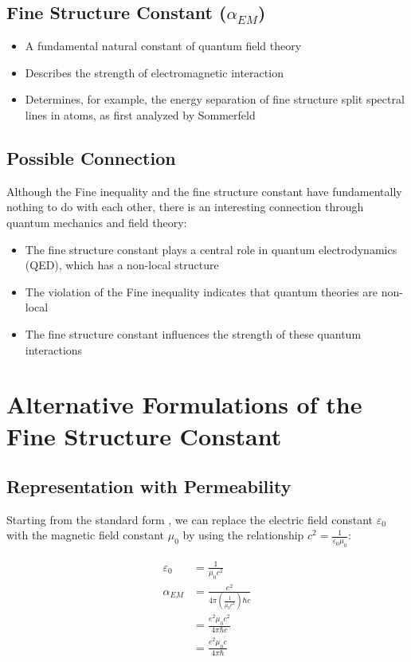 \documentclass[12pt,a4paper]{article}
\begin{document}
	\subsection{Fine Structure Constant ($\alpha_{EM}$)}
	\begin{itemize}
		\item A fundamental natural constant of quantum field theory \cite{Weinberg1995}
		\item Describes the strength of electromagnetic interaction
		\item Determines, for example, the energy separation of fine structure split spectral lines in atoms, as first analyzed by Sommerfeld \cite{Sommerfeld1916}
	\end{itemize}
	
	\subsection{Possible Connection}
	Although the Fine inequality and the fine structure constant have fundamentally nothing to do with each other, there is an interesting connection through quantum mechanics and field theory:
	
	\begin{itemize}
		\item The fine structure constant plays a central role in quantum electrodynamics (QED), which has a non-local structure
		\item The violation of the Fine inequality indicates that quantum theories are non-local
		\item The fine structure constant influences the strength of these quantum interactions
	\end{itemize}
	
	\section{Alternative Formulations of the Fine Structure Constant}
	
	\subsection{Representation with Permeability}
	Starting from the standard form \cite{Griffiths2017}, we can replace the electric field constant $\varepsilon_0$ with the magnetic field constant $\mu_0$ by using the relationship $c^2 = \frac{1}{\varepsilon_0\mu_0}$:
	
	\begin{align}
		\varepsilon_0 &= \frac{1}{\mu_0c^2}\\
		\alpha_{EM} &= \frac{e^2}{4\pi\left(\frac{1}{\mu_0c^2}\right)\hbar c}\\
		&= \frac{e^2\mu_0c^2}{4\pi\hbar c}\\
		&= \frac{e^2\mu_0c}{4\pi\hbar}
	\end{align}
	
\end{document}
